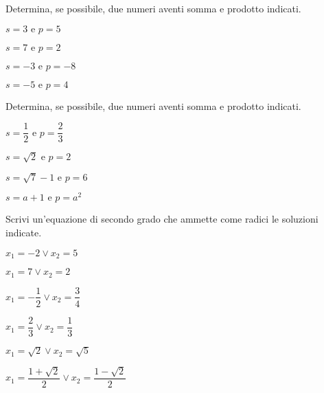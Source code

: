 \begin{esercizio}
 \label{ese:3.77}
Determina, se possibile, due numeri aventi somma e prodotto indicati.
\begin{multicols}{2}
\begin{enumeratea}
\item\(s = 3 \text{ e } p = 5\)
\item\(s = 7 \text{ e } p = 2\)
\item\(s =-3 \text{ e } p =-8\)
\item\(s =-5 \text{ e } p = 4\)
\end{enumeratea}
\end{multicols}
\end{esercizio}

\begin{esercizio}
 \label{ese:3.78}
Determina, se possibile, due numeri aventi somma e prodotto indicati.
\begin{multicols}{2}
\begin{enumeratea}
\item\(s = \dfrac{1}{2} \text{ e } p = \dfrac{2}{3}\)
\item\(s = \sqrt{2} \text{ e } p = 2\)
\item\(s = \sqrt{7}-1 \text{ e } p = 6\)
\item\(s = a + 1 \text{ e } p= a^{2}\)
\end{enumeratea}
\end{multicols}
\end{esercizio}

\begin{esercizio}
 \label{ese:3.79}
Scrivi un'equazione di secondo grado che ammette come radici le soluzioni 
indicate.
\begin{multicols}{2}
\begin{enumeratea}
\item\(x_{1} =-2 \vee x_{2} = 5\)
\item\(x_{1} = 7 \vee x_{2} = 2\)
\item\(x_{1} =-\dfrac{1}{2} \vee x_{2} = \dfrac{3}{4}\)
\item\(x_{1} = \dfrac{2}{3} \vee x_{2} = \dfrac{1}{3}\)
\item\(x_{1} = \sqrt{2} \vee x_{2} = \sqrt{5}\)
\item\(x_{1} = \dfrac{1 + \sqrt{2}}{2} \vee x_{2} = \dfrac{1-\sqrt{2}}{2}\)
\end{enumeratea}
\end{multicols}
\end{esercizio}


